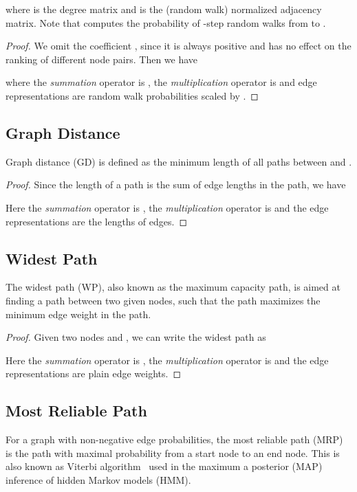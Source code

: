 where  is the degree matrix and  is the (random walk) normalized adjacency matrix.
Note that  computes the probability of -step random walks from  to .

\pagerank*
\begin{proof}
We omit the coefficient , since it is always positive and has no effect on the ranking of different node pairs.
Then we have 

where the \emph{summation} operator is , the \emph{multiplication} operator is  and edge representations are random walk probabilities scaled by .
\end{proof}

\subsection{Graph Distance}
Graph distance (GD) is defined as the minimum length of all paths between  and .

\distance*
\begin{proof}
Since the length of a path is the sum of edge lengths in the path, we have

Here the \emph{summation} operator is , the \emph{multiplication} operator is  and the edge representations are the lengths of edges.
\end{proof}

\subsection{Widest Path}
The widest path (WP), also known as the maximum capacity path, is aimed at finding a path between two given nodes, such that the path maximizes the minimum edge weight in the path.

\widest*
\begin{proof}
Given two nodes  and , we can write the widest path as

Here the \emph{summation} operator is , the \emph{multiplication} operator is  and the edge representations are plain edge weights.
\end{proof}

\subsection{Most Reliable Path}
For a graph with non-negative edge probabilities, the most reliable path (MRP) is the path with maximal probability from a start node to an end node. This is also known as Viterbi algorithm~\cite{viterbi1967error} used in the maximum a posterior (MAP) inference of hidden Markov models (HMM).

